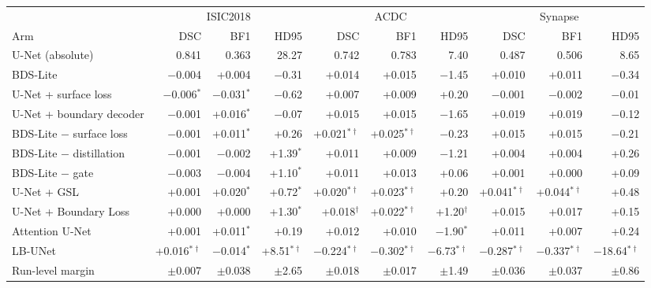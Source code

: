 \begin{tabular}{lrrrrrrrrr}
\toprule
 & \multicolumn{3}{c}{ISIC2018} & \multicolumn{3}{c}{ACDC} & \multicolumn{3}{c}{Synapse} \\
\cmidrule(lr){2-4}\cmidrule(lr){5-7}\cmidrule(lr){8-10}
Arm & DSC & BF1 & HD95 & DSC & BF1 & HD95 & DSC & BF1 & HD95 \\
\midrule
U-Net (absolute) & 0.841 & 0.363 & 28.27 & 0.742 & 0.783 & 7.40 & 0.487 & 0.506 & 8.65 \\
\midrule
BDS-Lite & $-$0.004 & +0.004 & $-$0.31 & +0.014 & +0.015 & $-$1.45 & +0.010 & +0.011 & $-$0.34 \\
\midrule
U-Net + surface loss & $-$0.006$^{*}$ & $-$0.031$^{*}$ & $-$0.62 & +0.007 & +0.009 & +0.20 & $-$0.001 & $-$0.002 & $-$0.01 \\
U-Net + boundary decoder & $-$0.001 & +0.016$^{*}$ & $-$0.07 & +0.015 & +0.015 & $-$1.65 & +0.019 & +0.019 & $-$0.12 \\
BDS-Lite $-$ surface loss & $-$0.001 & +0.011$^{*}$ & +0.26 & +0.021$^{*\dagger}$ & +0.025$^{*\dagger}$ & $-$0.23 & +0.015 & +0.015 & $-$0.21 \\
BDS-Lite $-$ distillation & $-$0.001 & $-$0.002 & +1.39$^{*}$ & +0.011 & +0.009 & $-$1.21 & +0.004 & +0.004 & +0.26 \\
BDS-Lite $-$ gate & $-$0.003 & $-$0.004 & +1.10$^{*}$ & +0.011 & +0.013 & +0.06 & +0.001 & +0.000 & +0.09 \\
\midrule
U-Net + GSL & +0.001 & +0.020$^{*}$ & +0.72$^{*}$ & +0.020$^{*\dagger}$ & +0.023$^{*\dagger}$ & +0.20 & +0.041$^{*\dagger}$ & +0.044$^{*\dagger}$ & +0.48 \\
U-Net + Boundary Loss & +0.000 & +0.000 & +1.30$^{*}$ & +0.018$^{\dagger}$ & +0.022$^{*\dagger}$ & +1.20$^{\dagger}$ & +0.015 & +0.017 & +0.15 \\
Attention U-Net & +0.001 & +0.011$^{*}$ & +0.19 & +0.012 & +0.010 & $-$1.90$^{*}$ & +0.011 & +0.007 & +0.24 \\
LB-UNet & +0.016$^{*\dagger}$ & $-$0.014$^{*}$ & +8.51$^{*\dagger}$ & $-$0.224$^{*\dagger}$ & $-$0.302$^{*\dagger}$ & $-$6.73$^{*\dagger}$ & $-$0.287$^{*\dagger}$ & $-$0.337$^{*\dagger}$ & $-$18.64$^{*\dagger}$ \\
\midrule
Run-level margin & $\pm$0.007 & $\pm$0.038 & $\pm$2.65 & $\pm$0.018 & $\pm$0.017 & $\pm$1.49 & $\pm$0.036 & $\pm$0.037 & $\pm$0.86 \\
\bottomrule
\end{tabular}
